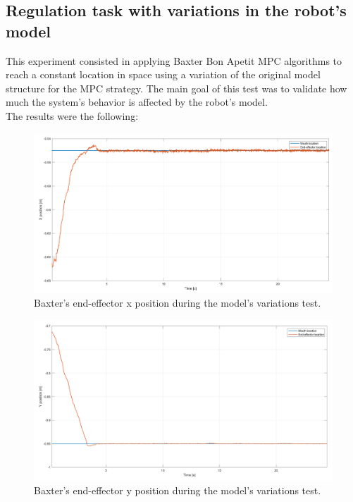 \documentclass[11pt]{report} %
\begin{document}
\subsection{Regulation task with variations in the robot's model}

This experiment consisted in applying Baxter Bon Apetit MPC algorithms to reach a constant location in space using a variation of the original model structure for the MPC strategy. The main goal of this test was to validate how much the system's behavior is affected by the robot's model. \\

The results were the following: 

\begin{figure}[H]
    \centering
    \includegraphics[width=1.0\linewidth]{assets/imgs/control_theory/mpc_regulation_model_changed/x_pose.png}
    \caption{Baxter's end-effector x position during the model's variations test.} 
    \label{fig_baxter_x_pose_mpc_model_perturbations_experiments}
\end{figure}

\begin{figure}[H]
    \centering
    \includegraphics[width=1.0\linewidth]{assets/imgs/control_theory/mpc_regulation_model_changed/y_pose.png}
    \caption{Baxter's end-effector y position during the model's variations test.} 
    \label{fig_baxter_y_pose_mpc_model_perturbations_experiments}
\end{figure}
\end{document}
